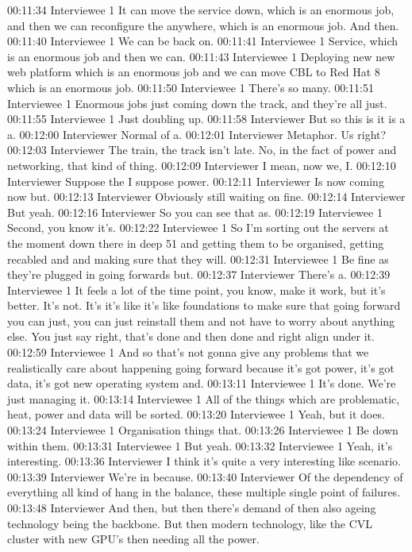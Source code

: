 00:11:34 Interviewee 1
It can move the service down, which is an enormous job, and then we can reconfigure the anywhere, which is an enormous job. And then.
00:11:40 Interviewee 1
We can be back on.
00:11:41 Interviewee 1
Service, which is an enormous job and then we can.
00:11:43 Interviewee 1
Deploying new new web platform which is an enormous job and we can move CBL to Red Hat 8 which is an enormous job.
00:11:50 Interviewee 1
There's so many.
00:11:51 Interviewee 1
Enormous jobs just coming down the track, and they're all just.
00:11:55 Interviewee 1
Just doubling up.
00:11:58 Interviewer
But so this is it is a a.
00:12:00 Interviewer
Normal of a.
00:12:01 Interviewer
Metaphor. Us right?
00:12:03 Interviewer
The train, the track isn't late. No, in the fact of power and networking, that kind of thing.
00:12:09 Interviewer
I mean, now we, I.
00:12:10 Interviewer
Suppose the I suppose power.
00:12:11 Interviewer
Is now coming now but.
00:12:13 Interviewer
Obviously still waiting on fine.
00:12:14 Interviewer
But yeah.
00:12:16 Interviewer
So you can see that as.
00:12:19 Interviewee 1
Second, you know it's.
00:12:22 Interviewee 1
So I'm sorting out the servers at the moment down there in deep 51 and getting them to be organised, getting recabled and and making sure that they will.
00:12:31 Interviewee 1
Be fine as they're plugged in going forwards but.
00:12:37 Interviewer
There's a.
00:12:39 Interviewee 1
It feels a lot of the time point, you know, make it work, but it's better. It's not. It's it's like it's like foundations to make sure that going forward you can just, you can just reinstall them and not have to worry about anything else. You just say right, that's done and then done and right align under it.
00:12:59 Interviewee 1
And so that's not gonna give any problems that we realistically care about happening going forward because it's got power, it's got data, it's got new operating system and.
00:13:11 Interviewee 1
It's done. We're just managing it.
00:13:14 Interviewee 1
All of the things which are problematic, heat, power and data will be sorted.
00:13:20 Interviewee 1
Yeah, but it does.
00:13:24 Interviewee 1
Organisation things that.
00:13:26 Interviewee 1
Be down within them.
00:13:31 Interviewee 1
But yeah.
00:13:32 Interviewee 1
Yeah, it's interesting.
00:13:36 Interviewer
I think it's quite a very interesting like scenario.
00:13:39 Interviewer
We're in because.
00:13:40 Interviewer
Of the dependency of everything all kind of hang in the balance, these multiple single point of failures.
00:13:48 Interviewer
And then, but then there's demand of then also ageing technology being the backbone. But then modern technology, like the CVL cluster with new GPU's then needing all the power.

